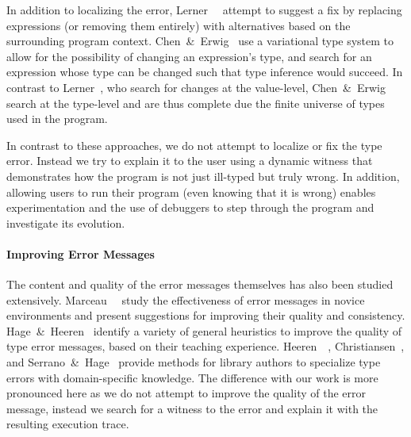 In addition to localizing the error, Lerner~\etal~\citealt{Lerner2007-dt} attempt to
suggest a fix by replacing expressions (or removing them entirely) with
alternatives based on the surrounding program context.
%
Chen~\&~Erwig~\citealt{Chen2014-gd} use a variational type system to allow for the
possibility of changing an expression's type, and search for an
expression whose type can be changed such that type inference would
succeed.
%
%
In contrast to Lerner~\etal, who search for changes at the value-level,
Chen~\&~Erwig search at the type-level and are thus complete due the finite
universe of types used in the program.
%
%

In contrast to these approaches, we do not attempt to localize or fix
the type error. Instead we try to explain it to the user using a
dynamic witness that demonstrates how the program is not just
ill-typed but truly wrong. In addition, allowing users to run their
program (even knowing that it is wrong)
enables experimentation and the
use of debuggers to step through the program and investigate its
evolution.

\paragraph{Improving Error Messages}
%
The content and quality of the error messages themselves has also been
studied extensively.
%
Marceau~\etal~\citealt{Marceau2011-ok,Marceau2011-cy} study the effectiveness of error
messages in novice environments and present suggestions for improving
their quality and consistency.
%
Hage~\&~Heeren~\citealt{Hage2006-hc} identify a variety of general heuristics to improve
the quality of type error messages, based on their teaching experience.
%
Heeren~\etal~\citealt{Heeren2003-db},
Christiansen~\citealt{Christiansen2014-qc}, and
Serrano~\&~Hage~\citealt{Serrano2016-oo}
provide methods for library authors to specialize
type errors with domain-specific knowledge.
%
The difference with our work is more pronounced here as we do not
attempt to improve the quality of the error message, instead we search
for a witness to the error and explain it with the resulting execution
trace.
%



